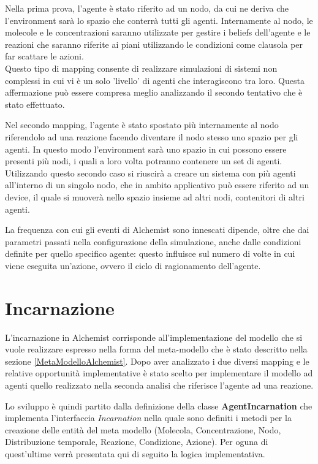 \documentclass[12pt,a4paper,openright,twoside]{report}
\begin{document}
Nella prima prova, l'agente \`e stato riferito ad un nodo, da cui ne deriva che l'environment sar\`a lo spazio che conterr\`a tutti gli agenti. Internamente al nodo, le molecole e le concentrazioni saranno utilizzate per gestire i beliefs dell'agente e le reazioni che saranno riferite ai piani utilizzando le condizioni come clausola per far scattare le azioni.
\\
Questo tipo di mapping consente di realizzare simulazioni di sistemi non complessi in cui vi \`e un solo 'livello' di agenti che interagiscono tra loro. Questa affermazione pu\`o essere compresa meglio analizzando il secondo tentativo che \`e stato effettuato.

Nel secondo mapping, l'agente \`e stato spostato pi\`u internamente al nodo riferendolo ad una reazione facendo diventare il nodo stesso uno spazio per gli agenti. In questo modo l'environment sar\`a uno spazio in cui possono essere presenti pi\`u nodi, i quali a loro volta potranno contenere un set di agenti.
\\
Utilizzando questo secondo caso si riuscir\`a a creare un sistema con pi\`u agenti all'interno di un singolo nodo, che in ambito applicativo pu\`o essere riferito ad un device, il quale si muover\`a nello spazio insieme ad altri nodi, contenitori di altri agenti.

La frequenza con cui gli eventi di Alchemist sono innescati dipende, oltre che dai parametri passati nella configurazione della simulazione, anche dalle condizioni definite per quello specifico agente: questo influisce sul numero di volte in cui viene eseguita un'azione, ovvero il ciclo di ragionamento dell'agente.

\section{Incarnazione}
L'incarnazione in Alchemist corrisponde all'implementazione del modello che si vuole realizzare espresso nella forma del meta-modello che \`e stato descritto nella sezione \ref{MetaModelloAlchemist}.
Dopo aver analizzato i due diversi mapping e le relative opportunit\`a implementative \`e stato scelto per implementare il modello ad agenti quello realizzato nella seconda analisi che riferisce l'agente ad una reazione.

Lo sviluppo \`e quindi partito dalla definizione della classe \textbf{AgentIncarnation} che implementa l'interfaccia \textit{Incarnation} nella quale sono definiti i metodi per la creazione delle entit\`a del meta modello (Molecola, Concentrazione, Nodo, Distribuzione temporale, Reazione, Condizione, Azione). Per oguna di quest'ultime verr\`a presentata qui di seguito la logica implementativa.
\end{document}
